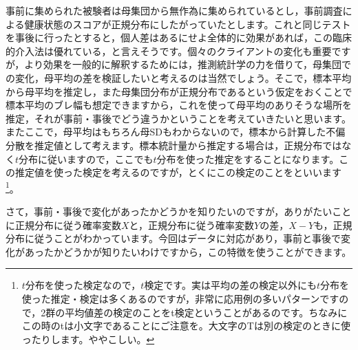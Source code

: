 \documentclass{ltjsbook}
\begin{document}
事前に集められた被験者は母集団から無作為に集められているとし，事前調査による健康状態のスコアが正規分布にしたがっていたとします。これと同じテストを事後に行ったとすると，個人差はあるにせよ全体的に効果があれば，この臨床的介入法は優れている，と言えそうです。個々のクライアントの変化も重要ですが，より効果を一般的に解釈するためには，推測統計学の力を借りて，母集団での変化，母平均の差を検証したいと考えるのは当然でしょう。そこで，標本平均から母平均を推定し，また母集団分布が正規分布であるという仮定をおくことで標本平均のブレ幅も想定できますから，これを使って母平均のありそうな場所を推定，それが事前・事後でどう違うかということを考えていきたいと思います。またここで，母平均はもちろん母SDもわからないので，標本から計算した不偏分散を推定値として考えます。標本統計量から推定する場合は，正規分布ではなく$t$分布に従いますので，ここでも$t$分布を使った推定をすることになります。この推定値を使った検定を考えるのですが，とくにこの検定のことをといいます\footnote{$t$分布を使った検定なので，$t$検定です。実は平均の差の検定以外にも$t$分布を使った推定・検定は多くあるのですが，非常に応用例の多いパターンですので，2群の平均値差の検定のことをt検定ということがあるのです。ちなみにこの時のtは小文字であることにご注意を。大文字のTは別の検定のときに使ったりします。ややこしい。}。


さて，事前・事後で変化があったかどうかを知りたいのですが，ありがたいことに正規分布に従う確率変数$X$と，正規分布に従う確率変数$Y$の差，$X-Y$も，正規分布に従うことがわかっています。今回はデータに対応があり，事前と事後で変化があったかどうかが知りたいわけですから，この特徴を使うことができます。
\end{document}
